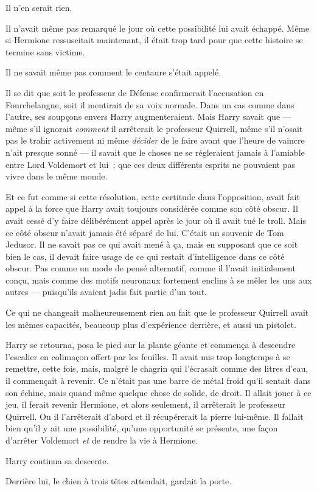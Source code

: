 Il n'en serait rien.

Il n'avait même pas remarqué le jour où cette possibilité lui avait échappé. Même si Hermione ressuscitait maintenant, il était trop tard pour que cette histoire se termine sans victime.

Il ne savait même pas comment le centaure s'était appelé.

Il se dit que soit le professeur de Défense confirmerait l'accusation en Fourchelangue, soit il mentirait de sa voix normale. Dans un cas comme dans l'autre, ses soupçons envers Harry augmenteraient. Mais Harry savait que — même s'il ignorait \emph{comment} il arrêterait le professeur Quirrell, même s'il n'osait pas le trahir activement ni même \emph{décider} de le faire avant que l'heure de vaincre n'ait presque sonné — il savait que le choses ne se régleraient jamais à l'amiable entre Lord Voldemort et lui~; que ces deux différents esprits ne pouvaient pas vivre dans le même monde.

Et ce fut comme si cette résolution, cette certitude dans l'opposition, avait fait appel à la force que Harry avait toujours considérée comme son côté obscur. Il avait cessé d'y faire délibérément appel après le jour où il avait tué le troll. Mais ce côté obscur n'avait jamais été séparé de lui. C'était un souvenir de Tom Jedusor. Il ne savait pas ce qui avait mené à ça, mais en supposant que ce soit bien le cas, il devait faire usage de ce qui restait d'intelligence dans ce côté obscur. Pas comme un mode de pensé alternatif, comme il l'avait initialement conçu, mais comme des motifs neuronaux fortement enclins à se mêler les uns aux autres — puisqu'ils avaient jadis fait partie d'un tout.

Ce qui ne changeait malheureusement rien au fait que le professeur Quirrell avait les mêmes capacités, beaucoup plus d'expérience derrière, et aussi un pistolet.

Harry se retourna, posa le pied sur la plante géante et commença à descendre l'escalier en colimaçon offert par les feuilles. Il avait mis trop longtemps à se remettre, cette fois, mais, malgré le chagrin qui l'écrasait comme des litres d'eau, il commençait à revenir. Ce n'était pas une barre de métal froid qu'il sentait dans son échine, mais quand même quelque chose de solide, de droit. Il allait jouer à ce jeu, il ferait revenir Hermione, et alors seulement, il arrêterait le professeur Quirrell. Ou il l'arrêterait d'abord et il récupérerait la pierre lui-même. Il fallait bien qu'il y ait une possibilité, qu'une opportunité se présente, une façon d'arrêter Voldemort \emph{et} de rendre la vie à Hermione.

Harry continua sa descente.

Derrière lui, le chien à trois têtes attendait, gardait la porte.
